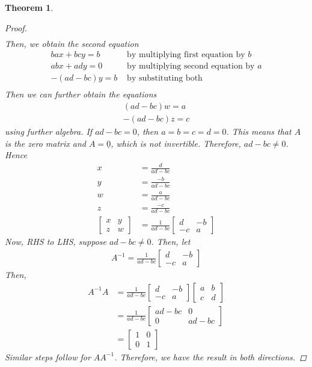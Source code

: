 \documentclass[a4paper]{article}
\theoremstyle{plain}
\newtheorem{thm}{Theorem}[section]
\theoremstyle{definition}
\theoremstyle{remark}
\begin{document}
\begin{thm}
\begin{proof}
\begin{align*}
		\end{align*}
		Then, we obtain the second equation
		\begin{align*}
			bax+bcy = b& \text{ by multiplying first equation by $b$}\\
			abx + ady = 0& \text{ by multiplying second equation by $a$}\\
			-(ad-bc)y = b & \text{ by substituting both} \\ 
		\end{align*}
		Then we can further obtain the equations
		\begin{align*}
			(ad-bc) w = a \\
			-(ad-bc)z = c
		\end{align*}
		using further algebra. If $ad-bc=0$, then $a=b=c=d=0$. This means that $A$ is the zero matrix and $A = \underline{0}$, which is not invertible. Therefore, $ad-bc \neq 0$. Hence
		\begin{align*}
			x &= \frac{d}{ad-bc} \\
			y&= \frac{-b}{ad-bc} \\
			w &= \frac{a}{ad-bc} \\
			z &= \frac{-c}{ad-bc}\\
			\begin{bmatrix} x & y \\ z & w \end{bmatrix}  &= \frac{1}{ad-bc}\begin{bmatrix} d & -b \\ -c & a \end{bmatrix} 
		\end{align*}
		Now, RHS to LHS, suppose $ad-bc \neq 0$. Then, let 
		\begin{align*}
			A^{-1} = \frac{1}{ad-bc}\begin{bmatrix} d & -b \\ -c & a \end{bmatrix} 
		\end{align*}
		Then,
		 \begin{align*}
			 A^{-1}A  &= \frac{1}{ad-bc}\begin{bmatrix} d & -b \\ -c & a \end{bmatrix} \begin{bmatrix} a & b \\ c & d \end{bmatrix} \\
				  &= \frac{1}{ad-bc}\begin{bmatrix} ad-bc & 0 \\ 0 & ad-bc \end{bmatrix} \\
				  &= \begin{bmatrix} 1 & 0 \\ 0 & 1 \end{bmatrix} 
		\end{align*}
		Similar steps follow for $A A^{-1}$. Therefore, we have the result in both directions.
	\end{proof}
\end{thm}
\end{document}
